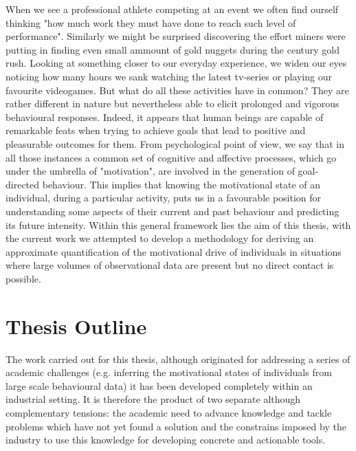 When we see a professional athlete competing at an event we often find ourself thinking "how much work they must have done to reach such level of performance". Similarly we might be surprised discovering the effort miners were putting in finding even small ammount of gold nuggets during the  century gold rush. Looking at something closer to our everyday experience, we widen our eyes noticing how many hours we sank watching the latest tv-series or playing our favourite videogames. But what do all these activities have in common? They are rather different in nature but nevertheless able to elicit prolonged and vigorous behavioural responses. Indeed, it appears that human beings are capable of remarkable feats when trying to achieve goals that lead to positive and pleasurable outcomes for them. From psychological point of view, we say that in all those instances a common set of cognitive and affective processes, which go under the umbrella of "motivation", are involved in the generation of goal-directed behaviour. This implies that knowing the motivational state of an individual, during a particular activity, puts us in a favourable position for understanding some aspects of their current and past behaviour and predicting its future intensity. Within this general framework lies the aim of this thesis, with the current work we attempted to develop a methodology for deriving an approximate quantification of the motivational drive of individuals in situations where large volumes of observational data are present but no direct contact is possible.

\section*{Thesis Outline}
The work carried out for this thesis, although originated for addressing a series of academic challenges (e.g. inferring the motivational states of individuals from large scale behavioural data) it has been developed completely within an industrial setting. It is therefore the product of two separate although complementary tensions: the academic need to advance knowledge and tackle problems which have not yet found a solution and the constrains imposed by the industry to use this knowledge for developing concrete and actionable tools.

